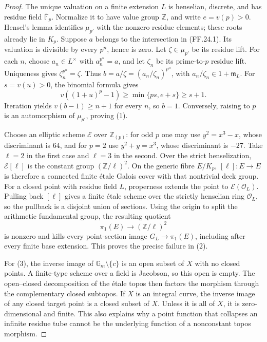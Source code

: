 \begin{proof}
The unique valuation on a finite extension \(L\) is
henselian, discrete, and has residue field
\(\overline{\mathbb F}_p\). Normalize it to have value
group \(\mathbb Z\), and write \(e=v(p)>0\).
Hensel's lemma identifies \(\mu_{p'}\) with the
nonzero residue elements; these roots already lie
in \(K_p\). Suppose \(a\) belongs to the intersection
in (FF.24.1). Its valuation is divisible by every
\(p^n\), hence is zero. Let \(\zeta\in\mu_{p'}\)
be its residue lift. For each \(n\), choose
\(a_n\in L^\times\) with \(a_n^{p^n}=a\), and
let \(\zeta_n\) be its prime-to-\(p\) residue lift.
Uniqueness gives \(\zeta_n^{p^n}=\zeta\).
Thus \(b=a/\zeta=(a_n/\zeta_n)^{p^n}\), with
\(a_n/\zeta_n\in1+\mathfrak m_L\).
For \(s=v(u)>0\), the binomial formula gives
\[
 v((1+u)^p-1)\geq\min\{ps,e+s\}\geq s+1.
\]
Iteration yields \(v(b-1)\geq n+1\) for every
\(n\), so \(b=1\). Conversely, raising to \(p\)
is an automorphism of \(\mu_{p'}\), proving (1).

Choose an elliptic scheme \(\mathcal E\) over
\(\mathbb Z_{(p)}\): for odd \(p\) one may use
\(y^2=x^3-x\), whose discriminant is \(64\),
and for \(p=2\) use \(y^2+y=x^3\), whose
discriminant is \(-27\). Take \(\ell=2\) in
the first case and \(\ell=3\) in the second.
Over the strict henselization, \(\mathcal E[\ell]\)
is the constant group \((\mathbb Z/\ell)^2\).
On the generic fibre \(E/K_p\),
\([\ell]:E\to E\) is therefore a connected
finite \'etale Galois cover with that nontrivial
deck group. For a closed point with residue field
\(L\), properness extends the point to
\(\mathcal E(\mathcal O_L)\). Pulling back
\([\ell]\) gives a finite \'etale scheme over
the strictly henselian ring \(\mathcal O_L\),
so the pullback is a disjoint union of sections.
Using the origin to split the arithmetic fundamental
group, the resulting quotient
\[
 \pi_1(E)\longrightarrow (\mathbb Z/\ell)^2
\]
is nonzero and kills every point-section image
\(G_L\to\pi_1(E)\), including after every finite
base extension. This proves the precise failure in (2).

For (3), the inverse image of
\(\mathbb G_m\setminus\{c\}\) is an open subset
of \(X\) with no closed points. A finite-type scheme
over a field is Jacobson, so this open is empty.
The open--closed decomposition of the \'etale topos
then factors the morphism through the complementary
closed subtopos. If \(X\) is an integral curve,
the inverse image of any closed target point is
a closed subset of \(X\). Unless it is all of
\(X\), it is zero-dimensional and finite. This
also explains why a point function that collapses
an infinite residue tube cannot be the underlying
function of a nonconstant topos morphism.


\end{proof}

